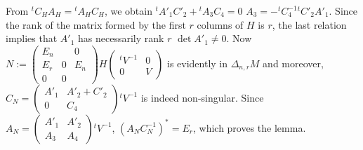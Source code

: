 From ${}^{t}C_{H}A_{H}={}^{t}A_{H}C_{H}$, we obtain
${}^{t}A'_{1}C'_{2}+{}^{t}A_{3}C_{4}=0$ \ie
$A_{3}=-{}^{t}C^{-1}_{4}{}^{t}C'_{2}A'_{1}$. Since the rank of the
matrix formed by the first $r$ columns of $H$ is $r$, the last
relation implies that $A'_{1}$ has necessarily rank $r$ \ie\break $\det
A'_{1}\neq 0$. Now $N:=\left(\begin{smallmatrix} E_{n} & & 0\\ E_{r} &
  0 & E_{n}\\ 0 & 0
  &\end{smallmatrix}\right)H\left(\begin{smallmatrix} {}^{t}V^{-1} &
  0\\ 0 & V\end{smallmatrix}\right)$ is evidently in $\Delta_{n,r}M$
  and moreover, $C_{N}=\left(\begin{smallmatrix} A'_{1} &
    A'_{2}+C'_{2}\\ 0 &
    C_{4}  \end{smallmatrix}\right){}^{t}V^{-1}$\pageoriginale 
  is indeed non-singular. Since $A_{N}=\left(\begin{smallmatrix}
    A'_{1} & A'_{2}\\ A_{3} &
    A_{4}  \end{smallmatrix}\right){}^{t}V^{-1}$,
  $(A_{N}C^{-1}_{N})^{\ast}=E_{r}$, which proves the lemma.

